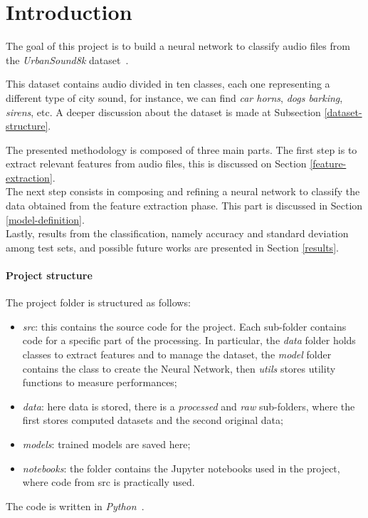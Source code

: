 \section{Introduction}

The goal of this project is to build a neural network to classify audio 
files from the \emph{UrbanSound8k} dataset~\cite{dataset}.

This dataset contains audio divided in ten classes, each one representing 
a different type of city sound, for instance, we can find \emph{car horns}, 
\emph{dogs barking}, \emph{sirens}, etc. A deeper discussion about 
the dataset is made at Subsection \vref*{dataset-structure}.

The presented methodology is composed of three main parts.
The first step is to extract relevant features from audio files, 
this is discussed on Section \vref*{feature-extraction}.\\
The next step consists in composing and refining a neural network 
to classify the data obtained from the feature extraction phase. This part is
discussed in Section \vref*{model-definition}.\\
Lastly, results from the classification, namely accuracy 
and standard deviation among test sets, and possible future works 
are presented in Section \vref*{results}.

\paragraph{Project structure}

The project folder is structured as follows:
\begin{itemize}
    \item \emph{src}: this contains the source code for the
    project. Each sub-folder contains code for a specific part of the 
    processing. In particular, the \emph{data} folder holds classes to 
    extract features and to manage the dataset, the \emph{model} folder
    contains the class to create the Neural Network, then \emph{utils} 
    stores utility functions to measure performances;
    \item \emph{data}: here data is stored, there is a \emph{processed}
    and \emph{raw} sub-folders, where the first stores computed datasets 
    and the second original data;
    \item \emph{models}: trained models are saved here;
    \item \emph{notebooks}: the folder contains the Jupyter notebooks 
    used in the project, where code from src is practically used.
\end{itemize}
The code is written in \emph{Python}~\cite{python}.
\newpage